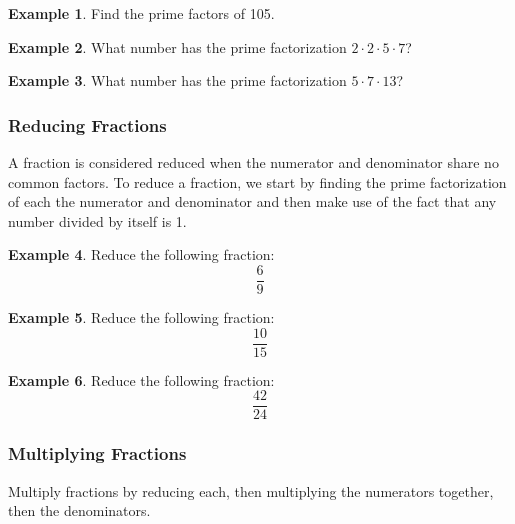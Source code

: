 \documentclass[addpoints,12pt]{exam}
\theoremstyle{definition}
\newtheorem{example}{Example}[subsection]
\begin{document}
\begin{example}
Find the prime factors of 105.
\vspace{3in}
\end{example}

\begin{example}
What number has the prime factorization $2\cdot 2\cdot 5\cdot 7$?
\vspace{.75in}
\end{example}

\begin{example}
What number has the prime factorization $5\cdot 7\cdot 13$?
\end{example}

\newpage

\subsubsection*{Reducing Fractions}
A fraction is considered reduced when the numerator and denominator share no common factors. To reduce a fraction, we start by finding the prime factorization of each the numerator and denominator and then make use of the fact that any number divided by itself is 1.

\vspace{.5in}

\begin{example}
Reduce the following fraction: \[\dfrac{6}{9}\]
\end{example}
\vspace{1in}

\begin{example}
Reduce the following fraction: \[\dfrac{10}{15}\]
\end{example}
\vspace{1in}

\begin{example}
Reduce the following fraction: \[\dfrac{42}{24}\]
\end{example}
\vspace{1in}

\newpage

\subsubsection*{Multiplying Fractions}
Multiply fractions by reducing each, then multiplying the numerators together, then the denominators.
\end{document}
